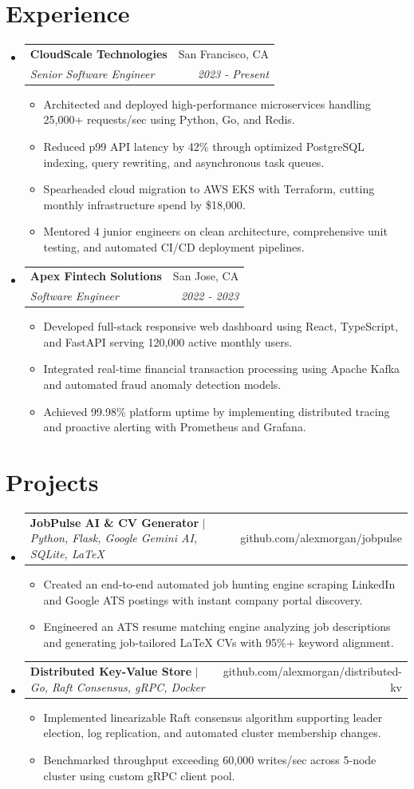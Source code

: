 \documentclass[letterpaper,10.8pt]{article}
\makeatletter
\newcommand{\resumeItem}[1]{
  \item\small{
    {#1 \vspace{-2pt}}
  }
}
\newcommand{\resumeSubheading}[4]{
  \vspace{-1pt}\item
    \begin{tabular*}{0.98\textwidth}[t]{l@{\extracolsep{\fill}}r}
      \textbf{#1} & #2 \\
      \textit{\small#3} & \textit{\small #4} \\
    \end{tabular*}\vspace{-6pt}
}
\newcommand{\resumeProjectHeading}[2]{
    \vspace{-1pt}\item
    \begin{tabular*}{0.98\textwidth}{l@{\extracolsep{\fill}}r}
      \small#1 & #2 \\
    \end{tabular*}\vspace{-6pt}
}
\newcommand{\resumeSubHeadingListStart}{\begin{itemize}[leftmargin=0.15in, label={}]}
\newcommand{\resumeSubHeadingListEnd}{\end{itemize}}
\newcommand{\resumeItemListStart}{\begin{itemize}[leftmargin=0.15in]}
\newcommand{\resumeItemListEnd}{\end{itemize}\vspace{-4pt}}
\makeatother
\begin{document}
\section{Experience}
  \resumeSubHeadingListStart
    \resumeSubheading
      {CloudScale Technologies}{San Francisco, CA}
      {Senior Software Engineer}{2023 - Present}
    \resumeItemListStart
      \resumeItem{Architected and deployed high-performance microservices handling 25,000+ requests/sec using Python, Go, and Redis.}
      \resumeItem{Reduced p99 API latency by 42\% through optimized PostgreSQL indexing, query rewriting, and asynchronous task queues.}
      \resumeItem{Spearheaded cloud migration to AWS EKS with Terraform, cutting monthly infrastructure spend by \$18,000.}
      \resumeItem{Mentored 4 junior engineers on clean architecture, comprehensive unit testing, and automated CI/CD deployment pipelines.}
    \resumeItemListEnd
    \resumeSubheading
      {Apex Fintech Solutions}{San Jose, CA}
      {Software Engineer}{2022 - 2023}
    \resumeItemListStart
      \resumeItem{Developed full-stack responsive web dashboard using React, TypeScript, and FastAPI serving 120,000 active monthly users.}
      \resumeItem{Integrated real-time financial transaction processing using Apache Kafka and automated fraud anomaly detection models.}
      \resumeItem{Achieved 99.98\% platform uptime by implementing distributed tracing and proactive alerting with Prometheus and Grafana.}
    \resumeItemListEnd
  \resumeSubHeadingListEnd

\section{Projects}
  \resumeSubHeadingListStart
    \resumeProjectHeading
      {\textbf{JobPulse AI \& CV Generator} $|$ \emph{Python, Flask, Google Gemini AI, SQLite, LaTeX}}{github.com/alexmorgan/jobpulse}
    \resumeItemListStart
      \resumeItem{Created an end-to-end automated job hunting engine scraping LinkedIn and Google ATS postings with instant company portal discovery.}
      \resumeItem{Engineered an ATS resume matching engine analyzing job descriptions and generating job-tailored LaTeX CVs with 95\%+ keyword alignment.}
    \resumeItemListEnd
    \resumeProjectHeading
      {\textbf{Distributed Key-Value Store} $|$ \emph{Go, Raft Consensus, gRPC, Docker}}{github.com/alexmorgan/distributed-kv}
    \resumeItemListStart
      \resumeItem{Implemented linearizable Raft consensus algorithm supporting leader election, log replication, and automated cluster membership changes.}
      \resumeItem{Benchmarked throughput exceeding 60,000 writes/sec across 5-node cluster using custom gRPC client pool.}
    \resumeItemListEnd
  \resumeSubHeadingListEnd
\end{document}
